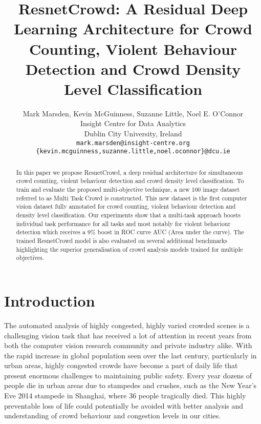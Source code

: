 \documentclass[10pt,twocolumn,letterpaper]{article}
\begin{document}
\title{ResnetCrowd: A Residual Deep Learning Architecture for Crowd Counting, Violent Behaviour Detection and Crowd Density Level Classification}

\author{Mark Marsden, Kevin McGuinness, Suzanne Little, Noel E. O'Connor\\
Insight Centre for Data Analytics \\
Dublin City University, Ireland\\
{\tt\small mark.marsden@insight-centre.org \{kevin.mcguinness,suzanne.little,noel.oconnor\}@dcu.ie}
}


\maketitle

\begin{abstract}
In this paper we propose ResnetCrowd, a deep residual architecture for simultaneous crowd counting, violent behaviour detection and crowd density level classification. To train and evaluate the proposed multi-objective technique, a new 100 image dataset referred to as Multi Task Crowd is constructed. This new dataset is the first computer vision dataset fully annotated for crowd counting, violent behaviour detection and density level classification. Our experiments show that a multi-task approach boosts individual task performance for all tasks and most notably for violent behaviour detection which receives a 9\% boost in ROC curve AUC (Area under the curve).  The trained ResnetCrowd model is also evaluated on several additional benchmarks highlighting the superior generalisation of crowd analysis models trained for multiple objectives.
 



\end{abstract}

\section{Introduction}
The automated analysis of highly congested, highly varied crowded scenes is a challenging vision task that has received a lot of attention in recent years from both the computer vision research community and private industry alike. With the rapid increase in global population seen over the last century, particularly in urban
areas, highly congested crowds have become a part of daily life that present enormous
challenges to maintaining public safety. Every year dozens of people die in urban areas
due to stampedes and crushes, such as the New Year's Eve 2014 stampede in Shanghai,
where 36 people tragically died. This highly preventable loss of life could potentially be avoided with better
analysis and understanding of crowd behaviour and congestion levels in our cities.
\end{document}
